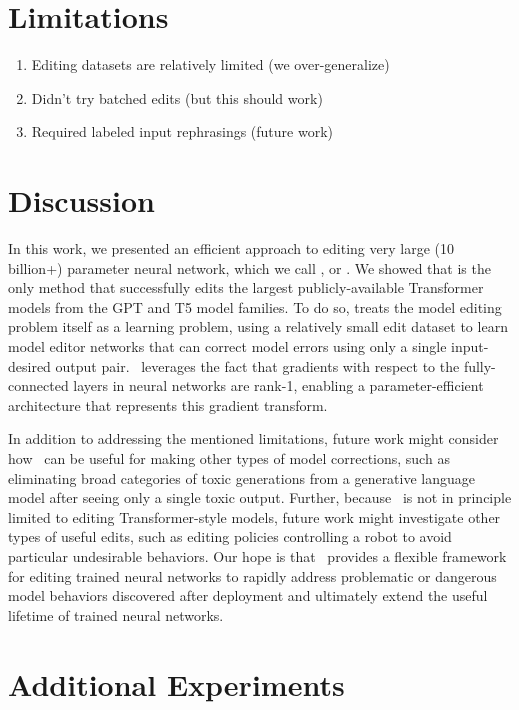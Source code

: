 \documentclass{article}
\begin{document}
\section{Limitations}
\begin{enumerate}
    \item Editing datasets are relatively limited (we over-generalize)
    \item Didn't try batched edits (but this should work)
    \item Required labeled input rephrasings (future work)
\end{enumerate}
\section{Discussion}
In this work, we presented an efficient approach to editing very large (10 billion+) parameter neural network, which we call \fullname, or \name. We showed that \name is the only method that successfully edits the largest publicly-available Transformer models from the GPT and T5 model families. To do so, \name treats the model editing problem itself as a learning problem, using a relatively small edit dataset to learn model editor networks that can correct model errors using only a single input-desired output pair. \name~leverages the fact that gradients with respect to the fully-connected layers in neural networks are rank-1, enabling a parameter-efficient architecture that represents this gradient transform.

In addition to addressing the mentioned limitations, future work might consider how \name~can be useful for making other types of model corrections, such as eliminating broad categories of toxic generations from a generative language model after seeing only a single toxic output. Further, because \name~is not in principle limited to editing Transformer-style models, future work might investigate other types of useful edits, such as editing policies controlling a robot to avoid particular undesirable behaviors. Our hope is that \name~provides a flexible framework for editing trained neural networks to rapidly address problematic or dangerous model behaviors discovered after deployment and ultimately extend the useful lifetime of trained neural networks.

\newpage



\newpage

\appendix

\section{Additional Experiments}
\end{document}
